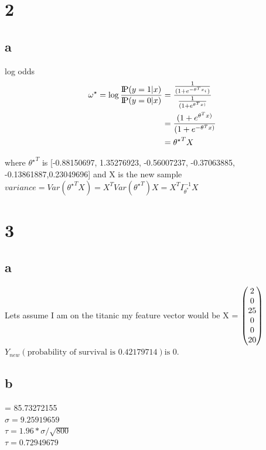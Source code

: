 \documentclass{article}
\newcommand{\probP}{\text{I\kern-0.15em P}}
\newcommand {\sig}{(1 + e^{-\theta^Tx_{i}})}
\begin{document}
\section{2}
\subsection{a}
log odds \\
\begin{align*}
    \omega^\star = \log \frac{\probP(y = 1 | x)}{\probP(y = 0 | x)} &= \frac{\frac{1}{\sig}}{\frac{1}{(1 + e^{\theta^Tx)}}} \\
    &= \frac{(1 + e^{\theta^Tx)}}{(1 + e^{-\theta^Tx)}}  \\
 &= {\theta^\star}^TX
\end{align*}

where ${\theta^\star}^T$ is {[-0.88150697,  1.35276923, -0.56007237, -0.37063885, -0.13861887,0.23049696] } and X is the new sample \\
\begin{math}
    variance = Var({\theta^\star}^TX) = X^TVar({\theta^\star}^T)X  = X^TI^{-1}_{\theta^*}X
\end{math}
\section{3}
\subsection{a}
Lets assume I am on the titanic my feature vector would be 
X = 
$
\begin{pmatrix}
    2 \\
    0 \\
    25 \\
    0 \\
    0 \\
    20
\end{pmatrix} \\
$
${Y_{new} \left( \text{probability of survival is 0.42179714} \right) \text{is 0.}} $\\
\subsection{b}
 = 85.73272155 \\
$\sigma = 9.25919659$ \\
$\tau = 1.96*\sigma/\sqrt{800}$ \\
$\tau = 0.72949679$ \\ 
\end{document}
